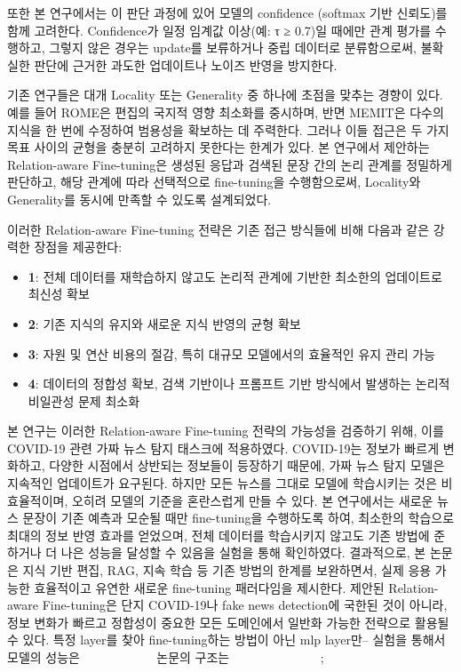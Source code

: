 \documentclass[a4paper,fleqn]{cas-sc}
\begin{document}
또한 본 연구에서는 이 판단 과정에 있어 모델의 confidence (softmax 기반 신뢰도)를 함께 고려한다. 
Confidence가 일정 임계값 이상(예: τ ≥ 0.7)일 때에만 관계 평가를 수행하고, 그렇지 않은 경우는 update를 보류하거나 중립 데이터로 분류함으로써, 불확실한 판단에 근거한 과도한 업데이트나 노이즈 반영을 방지한다.


기존 연구들은 대개 Locality 또는 Generality 중 하나에 초점을 맞추는 경향이 있다. 예를 들어 ROME은 편집의 국지적 영향 최소화를 중시하며, 반면 MEMIT은 다수의 지식을 한 번에 수정하여 범용성을 확보하는 데 주력한다. 그러나 이들 접근은 두 가지 목표 사이의 균형을 충분히 고려하지 못한다는 한계가 있다.
본 연구에서 제안하는 Relation-aware Fine-tuning은 생성된 응답과 검색된 문장 간의 논리 관계를 정밀하게 판단하고, 해당 관계에 따라 선택적으로 fine-tuning을 수행함으로써, Locality와 Generality를 동시에 만족할 수 있도록 설계되었다.

이러한 Relation-aware Fine-tuning 전략은 기존 접근 방식들에 비해 다음과 같은 강력한 장점을 제공한다:
\begin{itemize}
	\item{\textbf{1}:
	전체 데이터를 재학습하지 않고도 논리적 관계에 기반한 최소한의 업데이트로 최신성 확보}

	\item{\textbf{2}:
	기존 지식의 유지와 새로운 지식 반영의 균형 확보}

	\item{\textbf{3}:
	자원 및 연산 비용의 절감, 특히 대규모 모델에서의 효율적인 유지 관리 가능}

	\item{\textbf{4}:
	데이터의 정합성 확보, 검색 기반이나 프롬프트 기반 방식에서 발생하는 논리적 비일관성 문제 최소화}
\end{itemize}

본 연구는 이러한 Relation-aware Fine-tuning 전략의 가능성을 검증하기 위해, 이를 COVID-19 관련 가짜 뉴스 탐지 태스크에 적용하였다. 
COVID-19는 정보가 빠르게 변화하고, 다양한 시점에서 상반되는 정보들이 등장하기 때문에, 가짜 뉴스 탐지 모델은 지속적인 업데이트가 요구된다. 
하지만 모든 뉴스를 그대로 모델에 학습시키는 것은 비효율적이며, 오히려 모델의 기준을 혼란스럽게 만들 수 있다. 
본 연구에서는 새로운 뉴스 문장이 기존 예측과 모순될 때만 fine-tuning을 수행하도록 하여, 최소한의 학습으로 최대의 정보 반영 효과를 얻었으며, 전체 데이터를 학습시키지 않고도 기존 방법에 준하거나 더 나은 성능을 달성할 수 있음을 실험을 통해 확인하였다.
결과적으로, 본 논문은 지식 기반 편집, RAG, 지속 학습 등 기존 방법의 한계를 보완하면서, 실제 응용 가능한 효율적이고 유연한 새로운 fine-tuning 패러다임을 제시한다. 
제안된 Relation-aware Fine-tuning은 단지 COVID-19나 fake news detection에 국한된 것이 아니라, 정보 변화가 빠르고 정합성이 중요한 모든 도메인에서 일반화 가능한 전략으로 활용될 수 있다.
특정 layer를 찾아 fine-tuning하는 방법이 아닌 mlp layer만-- 실험을 통해서
모델의 성능은 ~~~~~~~~~~~
논문의 구조는 ~~~~~~~~~~~~~~;
\end{document}
